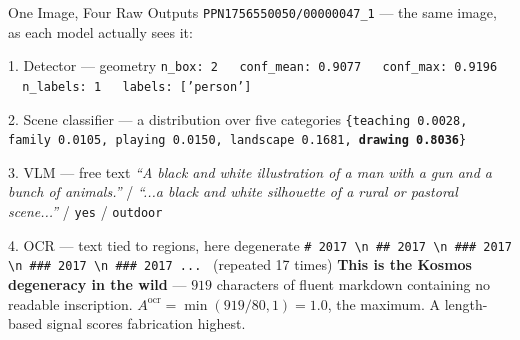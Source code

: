 \documentclass[aspectratio=169,11pt]{beamer}
\begin{document}
\begin{frame}{One Image, Four Raw Outputs}
\scriptsize
\texttt{PPN1756550050/00000047\_1} --- the same image, as each model actually sees it:
\vspace{1mm}
\begin{block}{\scriptsize 1. Detector --- geometry}
\tiny\texttt{n\_box: 2 \ \ conf\_mean: 0.9077 \ \ conf\_max: 0.9196 \ \ n\_labels: 1 \ \ labels: ['person']}
\end{block}
\vspace{-1.5mm}
\begin{block}{\scriptsize 2. Scene classifier --- a distribution over five categories}
\tiny\texttt{\{teaching 0.0028, family 0.0105, playing 0.0150, landscape 0.1681, \textbf{drawing 0.8036}\}}
\end{block}
\vspace{-1.5mm}
\begin{block}{\scriptsize 3. VLM --- free text}
\tiny\emph{``A black and white illustration of a man with a gun and a bunch of animals.''} / \emph{``...a black and white silhouette of a rural or pastoral scene...''} / \texttt{yes} / \texttt{outdoor}
\end{block}
\vspace{-1.5mm}
\begin{alertblock}{\scriptsize 4. OCR --- text tied to regions, here degenerate}
\tiny\texttt{\# 2017 \textbackslash n \#\# 2017 \textbackslash n \#\#\# 2017 \textbackslash n \#\#\# 2017 \textbackslash n \#\#\# 2017 ...} \ (repeated 17 times)
\vskip 1pt
\normalsize\textbf{\scriptsize This is the Kosmos degeneracy in the wild} --- $919$ characters of fluent markdown containing no readable inscription. $A^{\text{ocr}} = \min(919/80,1) = \mathbf{1.0}$, the maximum. A length-based signal scores fabrication highest.
\end{alertblock}
\end{frame}
\end{document}
